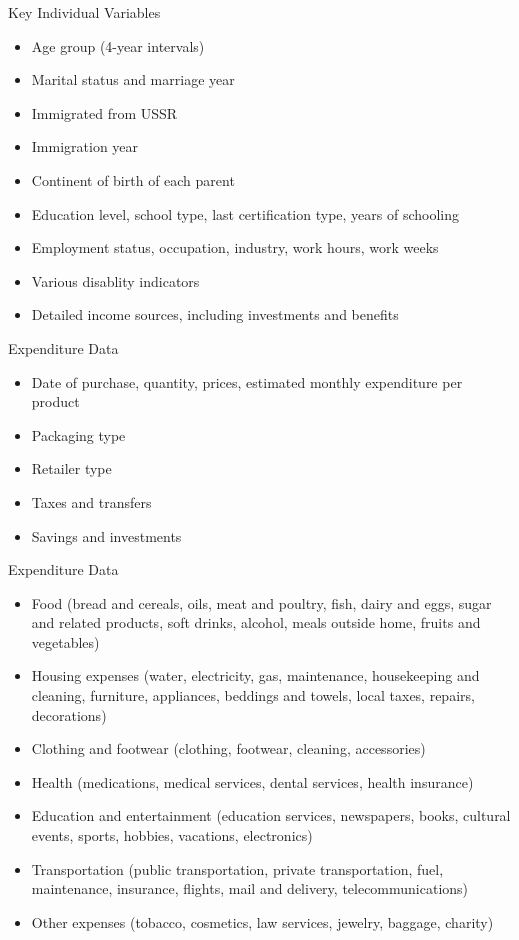 \documentclass{beamer}
\begin{document}
\begin{frame}{Key Individual Variables}
    \begin{itemize}
        \item Age group (4-year intervals)
        \item Marital status and marriage year
        \item Immigrated from USSR
        \item Immigration year
        \item Continent of birth of each parent
        \item Education level, school type, last certification type, years of schooling
        \item Employment status, occupation, industry, work hours, work weeks
        \item Various disablity indicators
        \item Detailed income sources, including investments and benefits
    \end{itemize}
\end{frame}

\begin{frame}{Expenditure Data}
    \begin{itemize}
        \item Date of purchase, quantity, prices, estimated monthly expenditure per product
        \item Packaging type
        \item Retailer type
        \item Taxes and transfers
        \item Savings and investments
    \end{itemize}
\end{frame}

\begin{frame}{Expenditure Data}
    \begin{itemize}
        \item Food (bread and cereals, oils, meat and poultry, fish, dairy and eggs, sugar and related products, soft drinks, alcohol, meals outside home, fruits and vegetables)
        \item Housing expenses (water, electricity, gas, maintenance, housekeeping and cleaning, furniture, appliances, beddings and towels, local taxes, repairs, decorations)
        \item Clothing and footwear (clothing, footwear, cleaning, accessories)
        \item Health (medications, medical services, dental services, health insurance)
        \item Education and entertainment (education services, newspapers, books, cultural events, sports, hobbies, vacations, electronics)
        \item Transportation (public transportation, private transportation, fuel, maintenance, insurance, flights, mail and delivery, telecommunications)
        \item Other expenses (tobacco, cosmetics, law services, jewelry, baggage, charity)
    \end{itemize}
\end{frame}
\end{document}
